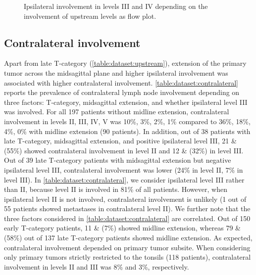 \documentclass[\relativeRoot/main.tex]{subfiles}
\begin{document}
\begin{figure}
    \def\svgwidth{1.0\textwidth}
    
    \caption[Flowchart showing the correlations of ipsilateral involvement in the LNLs II, III and IV]{
        Ipsilateral involvement in levels III and IV depending on the involvement of upstream levels as flow plot.
    }
    \label{fig:dataset:flowchart}
\end{figure}

\subsection*{Contralateral involvement}

Apart from late T-category (\cref{table:dataset:upstream}), extension of the primary tumor across the midsagittal plane and higher ipsilateral involvement was associated with higher contralateral involvement. \cref{table:dataset:contralateral} reports the prevalence of contralateral lymph node involvement depending on three factors: T-category, midsagittal extension, and whether ipsilateral level III was involved. For all 197 patients without midline extension, contralateral involvement in levels II, III, IV, V was 10\%, 3\%, 2\%, 1\% compared to 36\%, 18\%, 4\%, 0\% with midline extension (90 patients). In addition, out of 38 patients with late T-category, midsagittal extension, and positive ipsilateral level III, 21 \& (55\%) showed contralateral involvement in level II and 12 \& (32\%) in level III. Out of 39 late T-category patients with midsagittal extension but negative ipsilateral level III, contralateral involvement was lower (24\% in level II, 7\% in level III). In \cref{table:dataset:contralateral}, we consider ipsilateral level III rather than II, because level II is involved in 81\% of all patients. However, when ipsilateral level II is not involved, contralateral involvement is unlikely (1 out of 55 patients showed metastases in contralateral level II). We further note that the three factors considered in \cref{table:dataset:contralateral} are correlated. Out of 150 early T-category patients, 11 \& (7\%) showed midline extension, whereas 79 \& (58\%) out of 137 late T-category patients showed midline extension. As expected, contralateral involvement depended on primary tumor subsite. When considering only primary tumors strictly restricted to the tonsils (118 patients), contralateral involvement in levels II and III was 8\% and 3\%, respectively.
\end{document}

